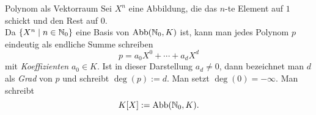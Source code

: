 \documentclass[main.tex]{subfiles}
\begin{document}
\begin{karte}{Polynom als Vektorraum}
    Sei \( X^n \) eine Abbildung, die das \(n\)-te Element auf 
    \(1\) schickt und den Rest auf \(0\).\\
    Da \( \{X^n \;\vert \; n\in \mathbb{N}_0\} \) eine Basis von 
    \( \operatorname{Abb}(\mathbb{N}_0, K) \) ist, kann man jedes 
    Polynom \(p\) eindeutig als endliche Summe schreiben 
    \[ p = a_0 X^0 + \cdots + a_d X^d \] 
    mit \textit{Koeffizienten} \( a_0 \in K \). Ist in dieser 
    Darstellung \( a_d \neq 0 \), dann bezeichnet man \(d\) als 
    \textit{Grad} von \(p\) und schreibt \( \deg(p) := d \). Man 
    setzt \( \deg(0) = -\infty \). Man schreibt 
    \[ K[X] := \operatorname{Abb}(\mathbb{N}_0, K). \]
\end{karte}
\end{document}
